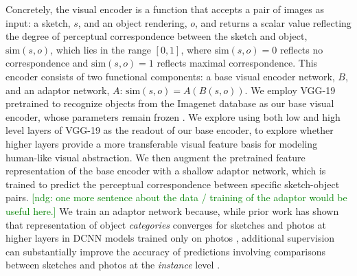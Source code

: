\documentclass[9pt,twocolumn,twoside]{pnas-new}
\newcommand{\ndg}[1]{\textcolor{Green}{[ndg: #1]}}
\begin{document}
Concretely, the visual encoder is a function that accepts a pair of images as input: a sketch, $s$, and an object rendering, $o$, and returns a scalar value reflecting the degree of perceptual correspondence between the sketch and object, $\textrm{sim}(s,o)$, which lies in the range $[0,1]$, where $\textrm{sim}(s,o)=0$ reflects no correspondence and $\textrm{sim}(s,o)=1$ reflects maximal correspondence.
This encoder consists of two functional components: a base visual encoder network, $B$, and an adaptor network, $A$: $\textrm{sim}(s,o) = A(B(s,o))$.
We employ VGG-19 pretrained to recognize objects from the Imagenet database as our base visual encoder, whose parameters remain frozen \cite{simonyan2014very}. 
We explore using both low and high level layers of VGG-19 as the readout of our base encoder, to explore whether higher layers provide a more transferable visual feature basis for modeling human-like visual abstraction.
We then augment the pretrained feature representation of the base encoder with a shallow adaptor network, which is trained to predict the perceptual correspondence between specific sketch-object pairs. \ndg{one more sentence about the data / training of the adaptor would be useful here.}
We train an adaptor network because, while prior work has shown that representation of object \textit{categories} converges for sketches and photos at higher layers in DCNN models trained only on photos \cite{FanCommon2018}, additional supervision can substantially improve the accuracy of predictions involving comparisons between sketches and photos at the \textit{instance} level \cite{sangkloy2016sketchy}. 
\end{document}

